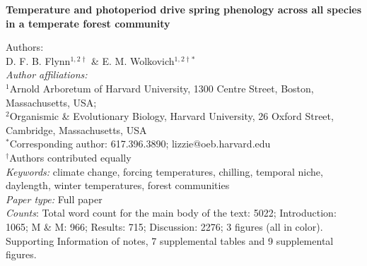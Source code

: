 \documentclass[11pt]{article}
\begin{document}
 
  
\noindent \textbf{\large{Temperature and photoperiod drive spring phenology across all species in a temperate forest community}}


\noindent Authors:\\
D. F. B. Flynn$^{1,2\dagger}$ \& E. M. Wolkovich$^{1,2\dagger *}$
\vspace{2ex}\\
\emph{Author affiliations:}\\
$^{1}$Arnold Arboretum of Harvard University, 1300 Centre Street, Boston, Massachusetts, USA; \\
$^{2}$Organismic \& Evolutionary Biology, Harvard University, 26 Oxford Street, Cambridge, Massachusetts, USA
\vspace{2ex}\\
$^*$Corresponding author: 617.396.3890; lizzie@oeb.harvard.edu\\
$^\dagger$Authors contributed equally\\

\noindent \emph{Keywords:} climate change, forcing temperatures, chilling, temporal niche, daylength, winter temperatures, forest communities\\ %
\emph{Paper type:} Full paper\\
 \emph{Counts}: Total word count for the main body of the text:  5022; Introduction: 1065; M \& M: 966; Results: 715; Discussion: 2276; 3 figures (all in color). Supporting Information of notes, 7 supplemental tables and 9 supplemental figures.\\



\end{document}
